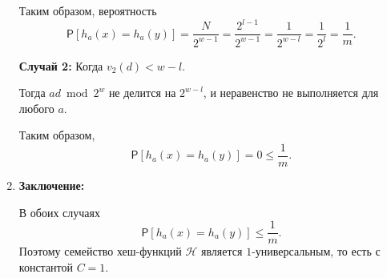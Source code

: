 \documentclass[11pt]{article}
\newcommand{\Prb}{\ensuremath{\mathsf{P}}}  %
\renewcommand{\le}{\leqslant}   %
\begin{document}
\begin{solution}
\begin{enumerate}
        Таким образом, вероятность
        \[
        \Prb[h_{a}(x) = h_{a}(y)] = \dfrac{N}{2^{w - 1}} = \dfrac{2^{l - 1}}{2^{w - 1}} = \dfrac{1}{2^{w - l}} = \dfrac{1}{2^{l}} = \dfrac{1}{m}.
        \]
    
        \textbf{Случай 2:} Когда $v_2(d) < w - l$.
    
        Тогда $a d \bmod 2^w$ не делится на $2^{w - l}$, и неравенство не выполняется для любого $a$.
    
        Таким образом,
        \[
        \Prb[h_{a}(x) = h_{a}(y)] = 0 \le \dfrac{1}{m}.
        \]
    
        \item \textbf{Заключение:}
    
        В обоих случаях
        \[
        \Prb[h_{a}(x) = h_{a}(y)] \le \dfrac{1}{m}.
        \]
        Поэтому семейство хеш-функций $\mathcal{H}$ является $1$-универсальным, то есть с константой $C = 1$.
    \end{enumerate}
\end{solution}
\end{document}
